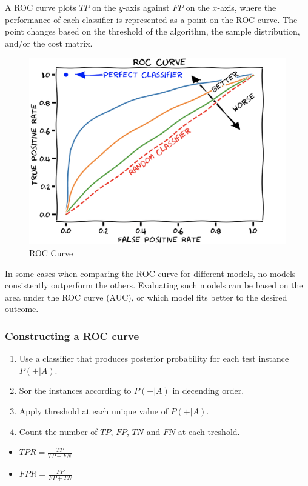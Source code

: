 A ROC curve plots $TP$ on the $y$-axis against $FP$ on the $x$-axis, where the performance of each classifier is represented as a point on the ROC curve.
The point changes based on the threshold of the algorithm, the sample distribution, and/or the cost matrix.

\bigskip
\begin{figure}[H]
    \centering
    \includegraphics[scale=0.25]{figures/roccurve.png}
    \caption{ROC Curve}
\end{figure}

In some cases when comparing the ROC curve for different models, no models consistently outperform the others. Evaluating such models can be based on the area under the ROC curve (AUC), or which model fits better to the desired outcome.

\subsubsection{Constructing a ROC curve}
\begin{enumerate}
    \item Use a classifier that produces posterior probability for each test instance $P(+|A)$.
    \item Sor the instances according to $P(+|A)$ in decending order.
    \item Apply threshold at each unique value of $P(+|A)$.
    \item Count the number of $TP$, $FP$, $TN$ and $FN$ at each treshold.
\end{enumerate}
\begin{itemize}
    \item $TPR = \frac{TP}{TP+FN}$
    \item $FPR = \frac{FP}{FP+TN}$
\end{itemize}
